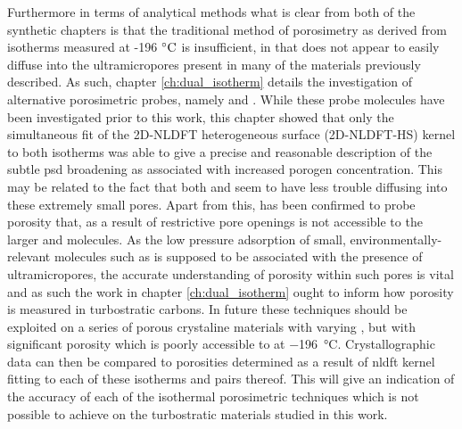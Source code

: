 Furthermore in terms of analytical methods what is clear from both of the synthetic chapters is that the traditional method of porosimetry as derived from  isotherms measured at -196 $\rm ^{\circ}C$ is insufficient, in that  does not appear to easily diffuse into the \glspl{ultramicropore} present in many of the materials previously described. As such, chapter \ref{ch:dual_isotherm} details the investigation of alternative porosimetric probes, namely  and . While these probe molecules have been investigated prior to this work, this chapter showed that only the simultaneous fit of the 2D-NLDFT heterogeneous surface (2D-NLDFT-HS) kernel to both isotherms was able to give a precise and reasonable description of the subtle \acrshort{psd} broadening as associated with increased \gls{porogen} concentration. This may be related to the fact that both  and  seem to have less trouble diffusing into these extremely small pores. Apart from this,  has been confirmed to probe porosity that, as a result of restrictive pore openings is not accessible to the larger  and  molecules. As the low pressure \gls{adsorption} of small, environmentally-relevant molecules such as  is supposed to be associated with the presence of \glspl{ultramicropore}, the accurate understanding of porosity within such pores is vital and as such the work in chapter \ref{ch:dual_isotherm} ought to inform how porosity is measured in \glspl{turbostratic carbon}. In future these techniques should be exploited on a series of porous crystaline materials with varying , but with significant porosity which is poorly accessible to  at \qty{-196}{\degreeCelsius}. Crystallographic data can then be compared to porosities determined as a result of \acrshort{nldft} kernel fitting to each of these isotherms and pairs thereof. This will give an indication of the accuracy of each of the isothermal porosimetric techniques which is not possible to achieve on the turbostratic materials studied in this work.


